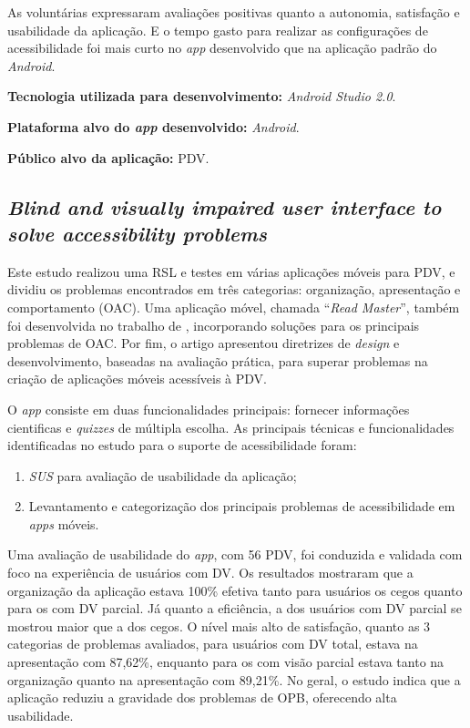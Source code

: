 As voluntárias expressaram avaliações positivas quanto a autonomia, satisfação e usabilidade da aplicação.
E o tempo gasto para realizar as configurações de acessibilidade foi mais curto no \emph{app} desenvolvido que na aplicação padrão do \emph{Android}.

\textbf{Tecnologia utilizada para desenvolvimento:} \emph{Android Studio 2.0}.

\textbf{Plataforma alvo do \emph{app} desenvolvido:} \emph{Android}.

\textbf{Público alvo da aplicação:} PDV\@.

\subsection{\emph{Blind and visually impaired user interface to solve accessibility problems}}

Este estudo realizou uma RSL e testes em várias aplicações móveis para PDV, e dividiu os problemas encontrados em três categorias: organização, apresentação e comportamento (OAC).
Uma aplicação móvel, chamada ``\emph{Read Master}'', também foi desenvolvida no trabalho de , incorporando soluções para os principais problemas de OAC.
Por fim, o artigo apresentou diretrizes de \emph{design} e desenvolvimento, baseadas na avaliação prática, para superar problemas na criação de aplicações móveis acessíveis à PDV\@.

O \emph{app} consiste em duas funcionalidades principais: fornecer informações cientificas e \emph{quizzes} de múltipla escolha.
As principais técnicas e funcionalidades identificadas no estudo para o suporte de acessibilidade foram:

\begin{enumerate}
\item \emph{SUS} para avaliação de usabilidade da aplicação;
\item Levantamento e categorização dos principais problemas de acessibilidade em \emph{apps} móveis.
\end{enumerate}

Uma avaliação de usabilidade do \emph{app}, com 56 PDV, foi conduzida e validada com foco na experiência de usuários com DV\@.
Os resultados mostraram que a organização da aplicação estava 100\% efetiva tanto para usuários os cegos quanto para os com DV parcial.
Já quanto a eficiência, a dos usuários com DV parcial se mostrou maior que a dos cegos.
O nível mais alto de satisfação, quanto as 3 categorias de problemas avaliados, para usuários com DV total, estava na apresentação com 87,62\%, enquanto para os com visão parcial estava tanto na organização quanto na apresentação com 89,21\%.
No geral, o estudo indica que a aplicação reduziu a gravidade dos problemas de OPB, oferecendo alta usabilidade.

